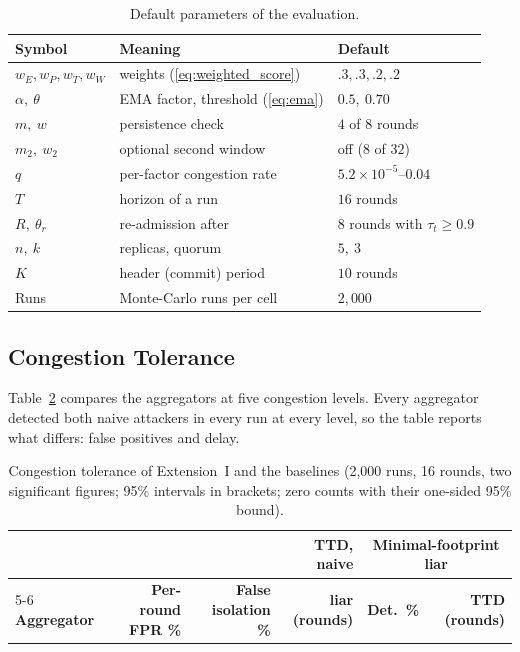 \begin{table}[!t]
\caption{Default parameters of the evaluation.}
\label{tab:params}
\centering
\renewcommand{\arraystretch}{1.1}
\footnotesize
\setlength{\tabcolsep}{3pt}
\begin{tabular}{lll}
\toprule
\textbf{Symbol} & \textbf{Meaning} & \textbf{Default} \\
\midrule
$w_E,w_P,w_T,w_W$ & weights (\ref{eq:weighted_score}) & $.3,.3,.2,.2$ \\
$\alpha,\ \theta$ & EMA factor, threshold (\ref{eq:ema}) & $0.5,\ 0.70$ \\
$m,\ w$ & persistence check & $4$ of $8$ rounds \\
$m_2,\ w_2$ & optional second window & off ($8$ of $32$) \\
$q$ & per-factor congestion rate & $5.2\times10^{-5}$--$0.04$ \\
$T$ & horizon of a run & $16$ rounds \\
$R,\ \theta_r$ & re-admission after & $8$ rounds with $\tau_t\ge0.9$ \\
$n,\ k$ & replicas, quorum & $5,\ 3$ \\
$K$ & header (commit) period & $10$ rounds \\
Runs & Monte-Carlo runs per cell & $2{,}000$ \\
\bottomrule
\end{tabular}
\end{table}

\subsection{Congestion Tolerance}
\label{sec:res-ext1}
Table~\ref{tab:headline} compares the aggregators at five congestion
levels.  Every aggregator detected both naive attackers in every run at
every level, so the table reports what differs: false positives and
delay.

\begin{table}[!t]
\caption{Congestion tolerance of Extension~I and the baselines (2{,}000 runs, 16 rounds, two significant figures; 95\% intervals in brackets; zero counts with their one-sided 95\% bound).}
\label{tab:headline}
\centering
\renewcommand{\arraystretch}{1.05}
\setlength{\tabcolsep}{5pt}
\footnotesize
\begin{tabular}{lrrrrr}
\toprule
 & & & \textbf{TTD, naive} & \multicolumn{2}{c}{\textbf{Minimal-footprint liar}} \\
\cmidrule(lr){5-6}
\textbf{Aggregator} & \textbf{Per-round FPR \%} & \textbf{False isolation \%} &
\textbf{liar (rounds)} & \textbf{Det.\ \%} & \textbf{TTD (rounds)} \\
\midrule
\bottomrule
\end{tabular}
\end{table}

